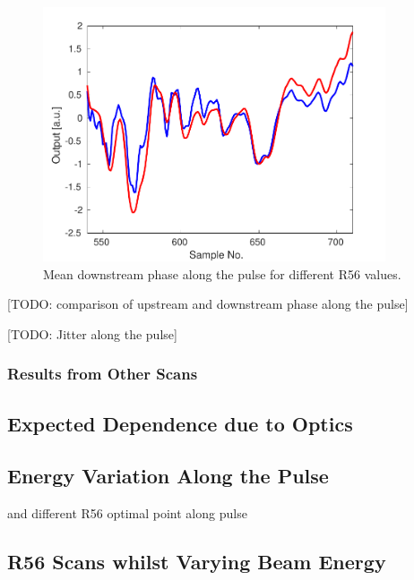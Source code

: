 \begin{figure}
  \centering
  \includegraphics[width=0.9\textwidth]{Figures/propagation/r56Scan_comparisonPhaseEnergy}
  \caption{Mean downstream phase along the pulse for different R56 values.}
  \label{f:r56Scan_comparisonPhaseEnergy}
\end{figure}

[TODO: comparison of upstream and downstream phase along the pulse]

[TODO: Jitter along the pulse]

\subsubsection{Results from Other Scans}


\subsection{Expected Dependence due to Optics}
\label{ss:t566Sim}

\subsection{Energy Variation Along the Pulse}
\label{ss:energyAlongPulse}

and different R56 optimal point along pulse

\subsection{R56 Scans whilst Varying Beam Energy}
\label{ss:r56ScanWithEnergy}

